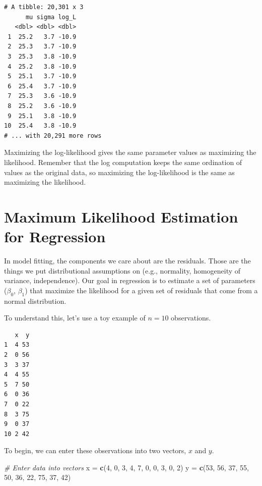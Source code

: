 \documentclass[]{book}
\newenvironment{Shaded}{\begin{snugshade}}{\end{snugshade}}
\newcommand{\CommentTok}[1]{\textcolor[rgb]{0.56,0.35,0.01}{\textit{#1}}}
\newcommand{\DecValTok}[1]{\textcolor[rgb]{0.00,0.00,0.81}{#1}}
\newcommand{\KeywordTok}[1]{\textcolor[rgb]{0.13,0.29,0.53}{\textbf{#1}}}
\newcommand{\NormalTok}[1]{#1}
\newcommand{\StringTok}[1]{\textcolor[rgb]{0.31,0.60,0.02}{#1}}
\begin{document}
\begin{verbatim}
# A tibble: 20,301 x 3
      mu sigma log_L
   <dbl> <dbl> <dbl>
 1  25.2   3.7 -10.9
 2  25.3   3.7 -10.9
 3  25.3   3.8 -10.9
 4  25.2   3.8 -10.9
 5  25.1   3.7 -10.9
 6  25.4   3.7 -10.9
 7  25.3   3.6 -10.9
 8  25.2   3.6 -10.9
 9  25.1   3.8 -10.9
10  25.4   3.8 -10.9
# ... with 20,291 more rows
\end{verbatim}

Maximizing the log-likelihood gives the same parameter values as maximizing the likelihood. Remember that the log computation keeps the same ordination of values as the original data, so maximizing the log-likelihood is the same as maximizing the likelihood.

\hypertarget{maximum-likelihood-estimation-for-regression}{%
\section{Maximum Likelihood Estimation for Regression}\label{maximum-likelihood-estimation-for-regression}}

In model fitting, the components we care about are the residuals. Those are the things we put distributional assumptions on (e.g., normality, homogeneity of variance, independence). Our goal in regression is to estimate a set of parameters (\(\beta_0\), \(\beta_1\)) that maximize the likelihood for a given set of residuals that come from a normal distribution.

To understand this, let's use a toy example of \(n=10\) observations.

\begin{verbatim}
   x  y
1  4 53
2  0 56
3  3 37
4  4 55
5  7 50
6  0 36
7  0 22
8  3 75
9  0 37
10 2 42
\end{verbatim}

To begin, we can enter these observations into two vectors, \(x\) and \(y\).

\begin{Shaded}
\begin{Highlighting}[]
\CommentTok{# Enter data into vectors}
\NormalTok{x =}\StringTok{ }\KeywordTok{c}\NormalTok{(}\DecValTok{4}\NormalTok{, }\DecValTok{0}\NormalTok{, }\DecValTok{3}\NormalTok{, }\DecValTok{4}\NormalTok{, }\DecValTok{7}\NormalTok{, }\DecValTok{0}\NormalTok{, }\DecValTok{0}\NormalTok{, }\DecValTok{3}\NormalTok{, }\DecValTok{0}\NormalTok{, }\DecValTok{2}\NormalTok{)}
\NormalTok{y =}\StringTok{ }\KeywordTok{c}\NormalTok{(}\DecValTok{53}\NormalTok{, }\DecValTok{56}\NormalTok{, }\DecValTok{37}\NormalTok{, }\DecValTok{55}\NormalTok{, }\DecValTok{50}\NormalTok{, }\DecValTok{36}\NormalTok{, }\DecValTok{22}\NormalTok{, }\DecValTok{75}\NormalTok{, }\DecValTok{37}\NormalTok{, }\DecValTok{42}\NormalTok{)}
\end{Highlighting}
\end{Shaded}
\end{document}

